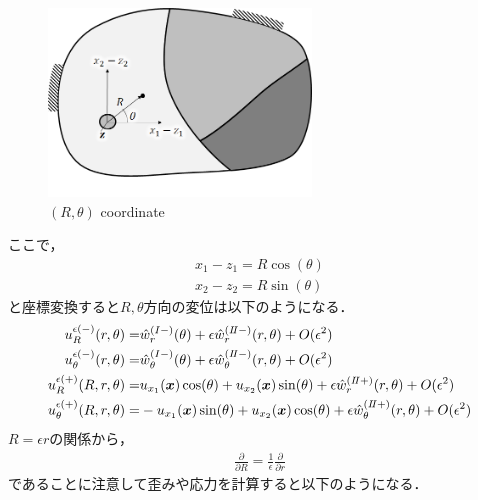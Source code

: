 \begin{figure}[ht]
	\begin{center}
		\includegraphics[height=5cm]{./figures/Rth.png}
		\caption{$(R,\theta)$ coordinate}
		\label{fig:Rth}
	\end{center}
\end{figure}
ここで，
\begin{align}
	x_{1}-z_{1}=R\cos(\theta)
	\nonumber
	\\
	x_{2}-z_{2}=R\sin(\theta)
	\label{eq:xyToRTh}
\end{align}
と座標変換すると$R,\theta$方向の変位は以下のようになる．
\begin{align}
	u_{R}^{\epsilon(-)}(r,\theta)=&\hat{w}_{r}^{(I-)}(\theta)
	+\epsilon\hat{w}_{r}^{(I\hspace{-.15em}I-)}(r,\theta)+O(\epsilon^2)
	\nonumber
	\\
	u_{\theta}^{\epsilon(-)}(r,\theta)=&\hat{w}_{\theta}^{(I-)}(\theta)
	+\epsilon\hat{w}_{\theta}^{(I\hspace{-.15em}I-)}(r,\theta)+O(\epsilon^2)
	\nonumber
	\\
	u_{R}^{\epsilon(+)}(R,r,\theta)=&u_{x_{1}}(\bm{x})\cos(\theta)+u_{x_{2}}(\bm{x})\sin(\theta)
	+\epsilon\hat{w}_{r}^{(I\hspace{-.15em}I+)}(r,\theta)+O(\epsilon^2)
	\nonumber
	\\
	u_{\theta}^{\epsilon(+)}(R,r,\theta)=&-u_{x_{1}}(\bm{x})\sin(\theta)+u_{x_{2}}(\bm{x})\cos(\theta)
	+\epsilon\hat{w}_{\theta}^{(I\hspace{-.15em}I+)}(r,\theta)+O(\epsilon^2)
	\label{eq:SDForTD}
\end{align}
$R=\epsilon r$の関係から，
\begin{align}
	\frac{\partial}{\partial R}=\frac{1}{\epsilon}\frac{\partial}{\partial r}
	\label{eq:RTor}
\end{align}
であることに注意して歪みや応力を計算すると以下のようになる．
